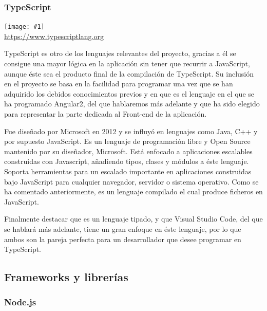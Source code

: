\documentclass[11pt,openany]{book}
\newcommand{\logo}[2]{\medskip\begin{center}\texttt{[image: \#1]}\\\scriptsize\url{#2}\end{center}\bigskip}
\begin{document}
\subsubsection{TypeScript}

\logo{logos/typescript.png}{https://www.typescriptlang.org}

TypeScript es otro de los lenguajes relevantes del proyecto, gracias a él se consigue una mayor lógica en la aplicación sin tener que recurrir a JavaScript, aunque éste sea el producto final de la compilación de TypeScript. Su inclusión en el proyecto se basa en la facilidad para programar una vez que se han adquirido los debidos conocimientos previos y en que es el lenguaje en el que se ha programado Angular2, del que hablaremos más adelante y que ha sido elegido para representar la parte dedicada al Front-end de la aplicación.

Fue diseñado por Microsoft en 2012 y se influyó en lenguajes como Java, C++ y por supuesto JavaScript\cite{3}. Es un lenguaje de programación libre y Open Source mantenido por su diseñador, Microsoft. Está enfocado a aplicaciones escalables construidas con Javascript, añadiendo tipos, clases y módulos a éste lenguaje. Soporta herramientas para un escalado importante en aplicaciones construidas bajo JavaScript para cualquier navegador, servidor o sistema operativo. Como se ha comentado anteriormente, es un lenguaje compilado el cual produce ficheros en JavaScript.

Finalmente destacar que es un lenguaje tipado, y que Visual Studio Code, del que se hablará más adelante, tiene un gran enfoque en éste lenguaje, por lo que ambos son la pareja perfecta para un desarrollador que desee programar en TypeScript.


\subsection{Frameworks y librerías}

\subsubsection{Node.js}
\end{document}

